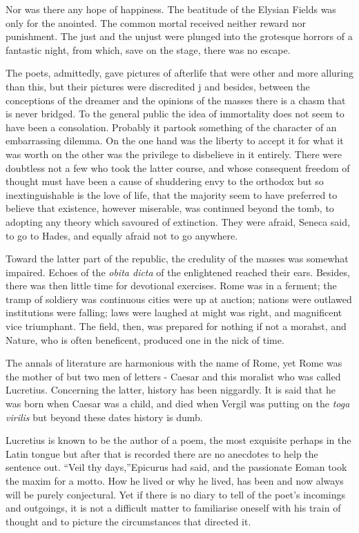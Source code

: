 \documentclass[]{book}
\begin{document}
Nor was there any hope of happiness. The beatitude of the Elysian Fields
was only for the anointed. The common mortal received neither reward nor
punishment. The just and the unjust were plunged into the grotesque
horrors of a fantastic night, from which, save on the stage, there was
no escape.

The poets, admittedly, gave pictures of afterlife that were other and
more alluring than this, but their pictures were discredited j and
besides, between the conceptions of the dreamer and the opinions of the
masses there is a chasm that is never bridged. To the general public the
idea of immortality does not seem to have been a consolation. Probably
it partook something of the character of an embarrassing dilemma. On the
one hand was the liberty to accept it for what it was worth on the other
was the privilege to disbelieve in it entirely. There were doubtless not
a few who took the latter course, and whose consequent freedom of
thought must have been a cause of shuddering envy to the orthodox but so
inextinguishable is the love of life, that the majority seem to have
preferred to believe that existence, however miserable, was continued
beyond the tomb, to adopting any theory which savoured of extinction.
They were afraid, Seneca said, to go to Hades, and equally afraid not to
go anywhere.

Toward the latter part of the republic, the credulity of the masses was
somewhat impaired. Echoes of the \emph{obita dicta} of the enlightened
reached their ears. Besides, there was then little time for devotional
exercises. Rome was in a ferment; the tramp of soldiery was continuous
cities were up at auction; nations were outlawed institutions were
falling; laws were laughed at might was right, and magnificent vice
triumphant. The field, then, was prepared for nothing if not a morahst,
and Nature, who is often beneficent, produced one in the nick of time.

The annals of literature are harmonious with the name of Rome, yet Rome
was the mother of but two men of letters - Caesar and this moralist who
was called Lucretius. Concerning the latter, history has been niggardly.
It is said that he was born when Caesar was a child, and died when
Vergil was putting on the \emph{toga virilis} but beyond these dates
history is dumb.

Lucretius is known to be the author of a poem, the most exquisite
perhaps in the Latin tongue but after that is recorded there are no
anecdotes to help the sentence out. ``Veil thy days,''Epicurus had said,
and the passionate Eoman took the maxim for a motto. How he lived or why
he lived, has been and now always will be purely conjectural. Yet if
there is no diary to tell of the poet's incomings and outgoings, it is
not a difficult matter to familiarise oneself with his train of thought
and to picture the circumstances that directed it.
\end{document}
